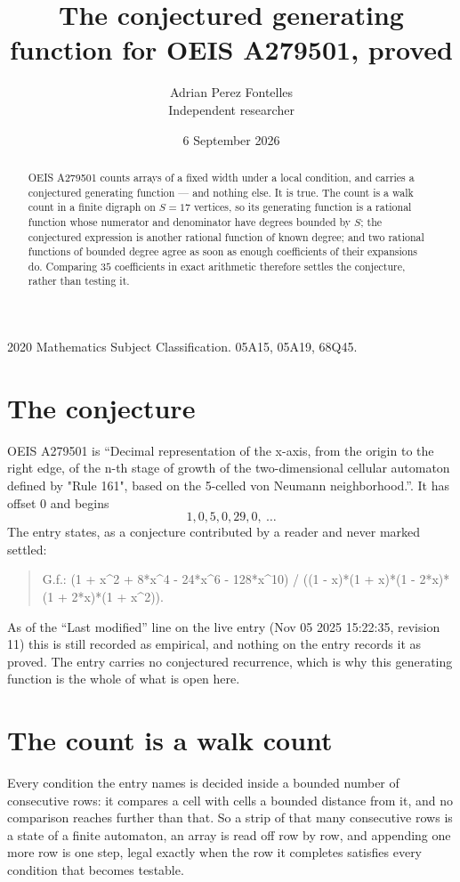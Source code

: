 \documentclass[11pt,a4paper]{article}
\title{The conjectured generating function for OEIS A279501, proved}
\author{Adrian Perez Fontelles\\ \small Independent researcher}
\date{6 September 2026}
\theoremstyle{plain}
\theoremstyle{definition}
\begin{document}
\maketitle

\begin{abstract}
OEIS A279501 counts arrays of a fixed width under a local condition, and carries a conjectured
generating function --- and nothing else. It is true. The count is a walk count in a finite
digraph on $S=17$ vertices, so its generating function is a rational function whose numerator
and denominator have degrees bounded by $S$; the conjectured expression is another rational
function of known degree; and two rational functions of bounded degree agree as soon as enough
coefficients of their expansions do. Comparing $35$ coefficients in exact arithmetic
therefore settles the conjecture, rather than testing it.
\end{abstract}

\noindent\small 2020 Mathematics Subject Classification. 05A15, 05A19, 68Q45.\normalsize

\section{The conjecture}

OEIS A279501 is ``Decimal representation of the x-axis, from the origin to the right edge, of the n-th stage of growth of the two-dimensional cellular automaton defined by "Rule 161", based on the 5-celled von Neumann neighborhood.''. It has offset $0$ and begins
\[
1, 0, 5, 0, 29, 0,\ \dots
\]
The entry states, as a conjecture contributed by a reader and never marked settled:
\begin{quote}
G.f.: (1 + x\^{}2 + 8*x\^{}4 - 24*x\^{}6 - 128*x\^{}10) / ((1 - x)*(1 + x)*(1 - 2*x)*(1 + 2*x)*(1 + x\^{}2)).
\end{quote}
As of the ``Last modified'' line on the live entry (Nov 05 2025 15:22:35, revision 11) this is still
recorded as empirical, and nothing on the entry records it as proved. The entry carries no
conjectured recurrence, which is why this generating function is the whole of what is open
here.

\section{The count is a walk count}

Every condition the entry names is decided inside a bounded number of consecutive rows: it
compares a cell with cells a bounded distance from it, and no comparison reaches further than
that. So a strip of that many consecutive rows is a state of a finite automaton, an array is
read off row by row, and appending one more row is one step, legal exactly when the row it
completes satisfies every condition that becomes testable.
\end{document}
